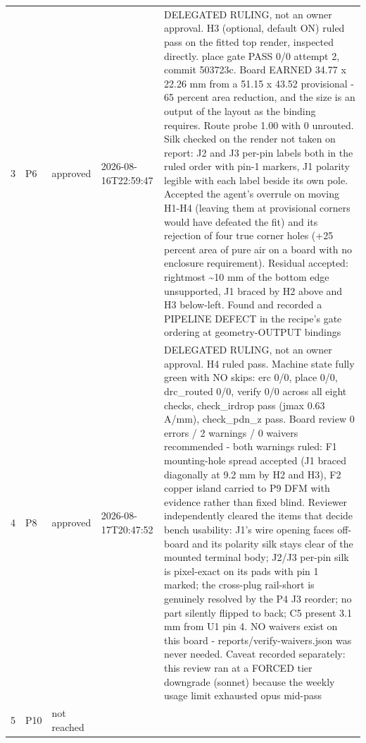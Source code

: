 \documentclass[11pt,a4paper]{article}
\begin{document}
{\begin{longtable}{lllp{2.6cm}p{6.4cm}}
3 & P6 & approved & 2026-08-16T22:59:47 & DELEGATED RULING, not an owner approval. H3 (optional, default ON) ruled pass on the fitted top render, inspected directly. place gate PASS 0/0 attempt 2, commit 503723c. Board EARNED 34.77 x 22.26 mm from a 51.15 x 43.52 provisional - 65 percent area reduction, and the size is an output of the layout as the binding requires. Route probe 1.00 with 0 unrouted. Silk checked on the render not taken on report: J2 and J3 per-pin labels both in the ruled order with pin-1 markers, J1 polarity legible with each label beside its own pole. Accepted the agent's overrule on moving H1-H4 (leaving them at provisional corners would have defeated the fit) and its rejection of four true corner holes (+25 percent area of pure air on a board with no enclosure requirement). Residual accepted: rightmost \textasciitilde{}10 mm of the bottom edge unsupported, J1 braced by H2 above and H3 below-left. Found and recorded a PIPELINE DEFECT in the recipe's gate ordering at geometry-OUTPUT bindings \\
4 & P8 & approved & 2026-08-17T20:47:52 & DELEGATED RULING, not an owner approval. H4 ruled pass. Machine state fully green with NO skips: erc 0/0, place 0/0, drc\_routed 0/0, verify 0/0 across all eight checks, check\_irdrop pass (jmax 0.63 A/mm), check\_pdn\_z pass. Board review 0 errors / 2 warnings / 0 waivers recommended - both warnings ruled: F1 mounting-hole spread accepted (J1 braced diagonally at 9.2 mm by H2 and H3), F2 copper island carried to P9 DFM with evidence rather than fixed blind. Reviewer independently cleared the items that decide bench usability: J1's wire opening faces off-board and its polarity silk stays clear of the mounted terminal body; J2/J3 per-pin silk is pixel-exact on its pads with pin 1 marked; the cross-plug rail-short is genuinely resolved by the P4 J3 reorder; no part silently flipped to back; C5 present 3.1 mm from U1 pin 4. NO waivers exist on this board - reports/verify-waivers.json was never needed. Caveat recorded separately: this review ran at a FORCED tier downgrade (sonnet) because the weekly usage limit exhausted opus mid-pass \\
5 & P10 & not reached &  &  \\
\bottomrule
\end{longtable}
}
\end{document}
